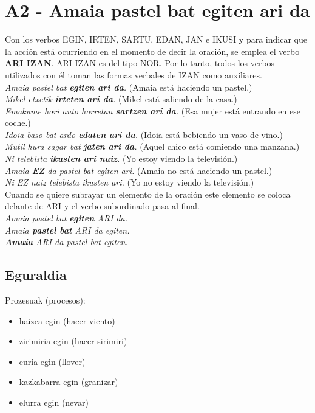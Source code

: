 \documentclass[11pt, a4paper]{article}
\begin{document}
\section{A2 - Amaia pastel bat egiten ari da}
\noindent Con los verbos EGIN, IRTEN, SARTU, EDAN, JAN e IKUSI y para indicar que la acción está ocurriendo en el momento de decir la oración, se emplea el verbo \textbf{ARI IZAN}. ARI IZAN es del tipo NOR. Por lo tanto, todos los verbos utilizados con él toman las formas verbales de IZAN como auxiliares.\\

\indent \textit{Amaia pastel bat \textbf{egiten ari da}.}
(Amaia está haciendo un pastel.)\\
\indent \textit{Mikel etxetik \textbf{irteten ari da}.}
(Mikel está saliendo de la casa.)\\
\indent \textit{Emakume hori auto horretan \textbf{sartzen ari da}.}
(Esa mujer está entrando en ese coche.)\\
\indent \textit{Idoia baso bat ardo \textbf{edaten ari da}.}
(Idoia está bebiendo un vaso de vino.)\\
\indent \textit{Mutil hura sagar bat \textbf{jaten ari da}.}
(Aquel chico está comiendo una manzana.)\\
\indent \textit{Ni telebista \textbf{ikusten ari naiz}.}
(Yo estoy viendo la televisión.)\\

\indent \textit{Amaia \textbf{EZ} da pastel bat egiten ari.}
(Amaia no está haciendo un pastel.)\\
\indent \textit{Ni EZ naiz telebista ikusten ari.}
(Yo no estoy viendo la televisión.)\\

\noindent Cuando se quiere subrayar un elemento de la oración este elemento se coloca delante de ARI y el verbo subordinado pasa al final.\\
\indent \textit{Amaia pastel bat \textbf{egiten} ARI da.}\\
\indent \textit{Amaia \textbf{pastel bat} ARI da egiten.}\\
\indent \textit{\textbf{Amaia} ARI da pastel bat egiten.}\\

\subsection{Eguraldia}
\noindent Prozesuak (procesos):
\begin{multicols}{2}
\begin{itemize}
\item haizea egin (hacer viento)
\item zirimiria egin (hacer sirimiri)
\item euria egin (llover)
\item kazkabarra egin (granizar)
\item elurra egin (nevar)
\end{itemize}
\end{multicols}
\end{document}
